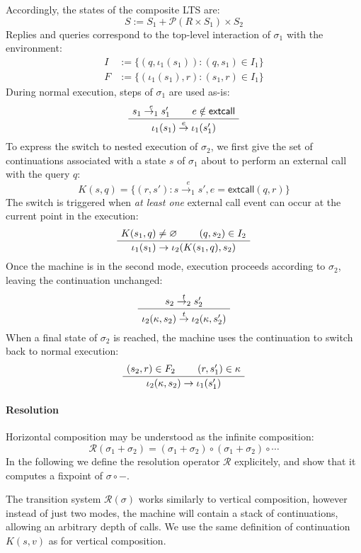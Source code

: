\documentclass[sigplan,10pt,review,anonymous]{acmart}
\newcommand{\kw}[1]{\ensuremath{ \textsf{#1} }}
\begin{document}
Accordingly,
the states of the composite LTS are:
\[
  S := S_1 + \mathcal{P}(R \times S_1) \times S_2
\]
Replies and queries
correspond to the top-level interaction of $\sigma_1$ with the environment:
\begin{align*}
  I &:= \{ (q, \iota_1(s_1)) : (q, s_1) \in I_1 \} \\
  F &:= \{ (\iota_1(s_1), r) : (s_1, r) \in I_1 \}
\end{align*}
During normal execution,
steps of $\sigma_1$ are used as-is:
\[
  \AxiomC{$s_1 \stackrel{e}{\rightarrow_1} s_1'$}
  \AxiomC{$e \notin \kw{extcall}$}
  \BinaryInfC{$\iota_1(s_1) \stackrel{e}{\rightarrow} \iota_1(s_1')$}
  \DisplayProof
\]
To express the switch to nested execution of $\sigma_2$,
we first give the set of continuations associated with a state $s$ of $\sigma_1$
about to perform an external call with the query $q$:
\[
  K(s, q) =
    \{ (r, s') : s \stackrel{e}{\rightarrow_1} s',
                     e = \kw{extcall}(q, r) \}
\]
The switch is triggered when \emph{at least one} external call event
can occur at the current point in the execution:
\[
  \AxiomC{$K(s_1, q) \ne \varnothing$}
  \AxiomC{$(q, s_2) \in I_2$}
  \BinaryInfC{$\iota_1(s_1) \rightarrow \iota_2(K(s_1, q), s_2)$}
  \DisplayProof
\]
Once the machine is in the second mode,
execution proceeds according to $\sigma_2$,
leaving the continuation unchanged:
\[
  \AxiomC{$s_2 \stackrel{t}{\rightarrow_2} s_2'$}
  \UnaryInfC{$
    \iota_2(\kappa, s_2)
    \stackrel{t}{\rightarrow}
    \iota_2(\kappa, s_2')$}
  \DisplayProof
\]
When a final state of $\sigma_2$ is reached,
the machine uses the continuation to switch back
to normal execution:
\[
  \AxiomC{$(s_2, r) \in F_2$}
  \AxiomC{$(r, s_1') \in \kappa$}
  \BinaryInfC{$\iota_2(\kappa, s_2) \rightarrow \iota_1(s_1')$}
  \DisplayProof
\]


\paragraph{Resolution} %

Horizontal composition may be understood as the infinite composition:
\[
  \mathcal{R}(\sigma_1 + \sigma_2) =
    (\sigma_1 + \sigma_2) \circ (\sigma_1 + \sigma_2) \circ \cdots
\]
In the following
we define the resolution operator $\mathcal{R}$ explicitely,
and show that it computes a fixpoint of $\sigma \circ -$.

The transition system $\mathcal{R}(\sigma)$
works similarly to vertical composition,
however instead of just two modes,
the machine will contain a stack of continuations,
allowing an arbitrary depth of calls.
We use the same definition of continuation $K(s, v)$
as for vertical composition.
\end{document}
